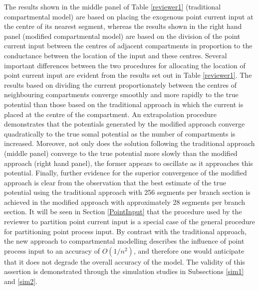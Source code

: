 The results shown in the middle panel of Table \ref{reviewer1}
(traditional compartmental model) are based on placing the
exogenous point current input at the centre of its nearest
segment, whereas the results shown in the right hand panel
(modified compartmental model) are based on the division of the
point current input between the centres of adjacent compartments
in proportion to the conductance between the location of the input
and these centres. Several important differences between the two
procedures for allocating the location of point current input are
evident from the results set out in Table \ref{reviewer1}. The
results based on dividing the current proportionately between the
centres of neighbouring compartments converge smoothly and more
rapidly to the true potential than those based on the traditional
approach in which the current is placed at the centre of the
compartment. An extrapolation procedure demonstrates that the
potentials generated by the modified approach converge
quadratically to the true somal potential as the number of
compartments is increased. Moreover, not only does the solution
following the traditional approach (middle panel) converge to the
true potential more slowly than the modified approach (right hand
panel), the former appears to oscillate as it approaches this
potential. Finally, further evidence for the superior convergence
of the modified approach is clear from the observation that the
best estimate of the true potential using the traditional approach
with 256 segments per branch section is achieved in the modified
approach with approximately 28 segments per branch section. It
will be seen in Section \ref{PointInput} that the procedure used
by the reviewer to partition point current input is a special case
of the general procedure for partitioning point process input. By
contrast with the traditional approach, the new approach to
compartmental modelling describes the influence of point process
input to an accuracy of $O(1/n^2)$, and therefore one would
anticipate that it does not degrade the overall accuracy of the
model. The validity of this assertion is demonstrated through the
simulation studies in Subsections \ref{sim1} and \ref{sim2}.
